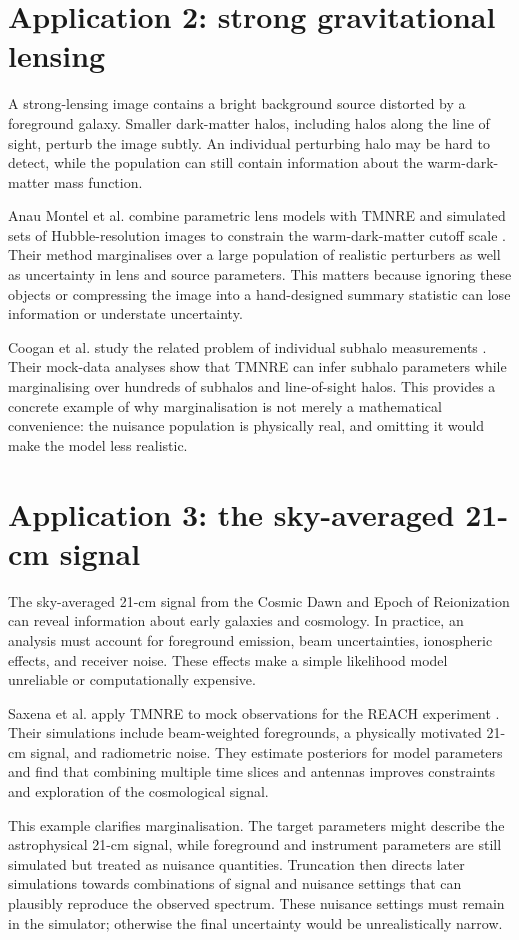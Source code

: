 ﻿\documentclass[11pt,a4paper]{article}
\begin{document}
\section{Application 2: strong gravitational lensing}
A strong-lensing image contains a bright background source distorted by a foreground galaxy. Smaller dark-matter halos, including halos along the line of sight, perturb the image subtly. An individual perturbing halo may be hard to detect, while the population can still contain information about the warm-dark-matter mass function.

Anau Montel et al. combine parametric lens models with TMNRE and simulated sets of Hubble-resolution images to constrain the warm-dark-matter cutoff scale \citep{tmnreStrongLensing}. Their method marginalises over a large population of realistic perturbers as well as uncertainty in lens and source parameters. This matters because ignoring these objects or compressing the image into a hand-designed summary statistic can lose information or understate uncertainty.

Coogan et al. study the related problem of individual subhalo measurements \citep{tmnrePerturberPopulation}. Their mock-data analyses show that TMNRE can infer subhalo parameters while marginalising over hundreds of subhalos and line-of-sight halos. This provides a concrete example of why marginalisation is not merely a mathematical convenience: the nuisance population is physically real, and omitting it would make the model less realistic.

\section{Application 3: the sky-averaged 21-cm signal}
The sky-averaged 21-cm signal from the Cosmic Dawn and Epoch of Reionization can reveal information about early galaxies and cosmology. In practice, an analysis must account for foreground emission, beam uncertainties, ionospheric effects, and receiver noise. These effects make a simple likelihood model unreliable or computationally expensive.

Saxena et al. apply TMNRE to mock observations for the REACH experiment \citep{tmnre21cm}. Their simulations include beam-weighted foregrounds, a physically motivated 21-cm signal, and radiometric noise. They estimate posteriors for model parameters and find that combining multiple time slices and antennas improves constraints and exploration of the cosmological signal.

This example clarifies marginalisation. The target parameters might describe the astrophysical 21-cm signal, while foreground and instrument parameters are still simulated but treated as nuisance quantities. Truncation then directs later simulations towards combinations of signal and nuisance settings that can plausibly reproduce the observed spectrum. These nuisance settings must remain in the simulator; otherwise the final uncertainty would be unrealistically narrow.
\end{document}
